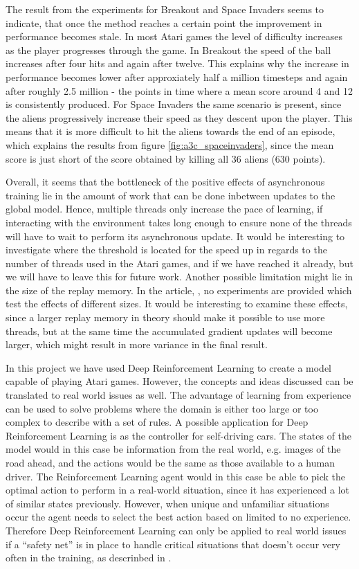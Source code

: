 \documentclass[11pt]{article}
\begin{document}
The result from the experiments for Breakout and Space Invaders
seems to indicate, that once the method reaches a certain point
the improvement in performance becomes stale.
In most Atari games the level of difficulty increases as the
player progresses through the game.
In Breakout the speed of the ball increases after
four hits and again after twelve.
This explains why the increase in performance becomes lower after
approxiately half a million timesteps and again after
roughly 2.5 million - the points in time where a mean score around 4 and 12
is consistently produced.
For Space Invaders the same scenario is present, since
the aliens progressively increase their speed as they
descent upon the player.
This means that it is more difficult to hit the aliens towards the end of an episode,
which explains the results from figure \ref{fig:a3c_spaceinvaders},
since the mean score is just short of the score obtained by killing all 36 aliens (630 points).

Overall,
it seems that the bottleneck of the positive effects of asynchronous training
lie in the amount of work that can be done inbetween updates to the global model.
Hence, multiple threads only increase the pace of learning, if
interacting with the environment takes long enough to ensure
none of the threads will have to wait to perform
its asynchronous update.
It would be interesting to investigate where the threshold is located
for the speed up in regards to the number of threads used in the Atari games,
and if we have reached it already, but we will have to leave this for future work.
Another possible limitation might lie in the size of the replay memory.
In the article, \cite{a3c}, no experiments are provided which test
the effects of different sizes.
It would be interesting to examine these effects, since a larger replay memory
in theory should make it possible to use more threads, but at the same time
the accumulated gradient updates will become larger, which might result in
more variance in the final result.

In this project we have used Deep Reinforcement Learning to
create a model capable of playing Atari games.
However, the concepts and ideas discussed can be translated to real world
issues as well.
The advantage of learning from experience can be used to solve problems where the
domain is either too large or too complex to
describe with a set of rules.
A possible application for Deep Reinforcement Learning is
as the controller for self-driving cars.
The states of the model would in this case be information
from the real world, e.g. images of the road ahead, 
and the actions would be the same as those available to
a human driver.
The Reinforcement Learning agent would in this case be able to pick the
optimal action to perform in a real-world situation, since
it has experienced a lot of similar states previously.
However, when unique and unfamiliar situations occur 
the agent needs to select the best action based on limited to no
experience.
Therefore Deep Reinforcement Learning can only be applied
to real world issues if a “safety net” is in place
to handle critical situations that doesn't occur
very often in the training, as descrinbed in \cite{BILER}.
\end{document}
